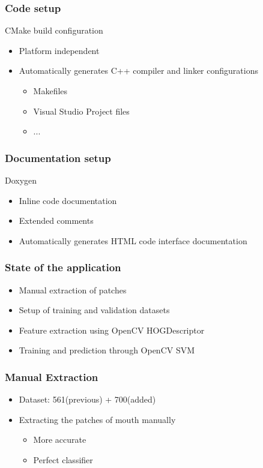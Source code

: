 \documentclass[serif,14pt]{beamer}
\begin{document}
\begin{frame}
  \frametitle{Code setup}
  
  CMake build configuration
  \begin{itemize}
      \item Platform independent
      \item Automatically generates C++ compiler and linker configurations
        \begin{itemize}
          \item Makefiles
          \item Visual Studio Project files
          \item ...
      	\end{itemize}
  \end{itemize}

\end{frame}

\begin{frame}
  \frametitle{Documentation setup}
  
  Doxygen
  \begin{itemize}
      \item Inline code documentation
      \item Extended comments
      \item Automatically generates HTML code interface documentation
  \end{itemize}

\end{frame}

\begin{frame}
  \frametitle{State of the application}
  \begin{itemize}
  	  \item Manual extraction of patches
      \item Setup of training and validation datasets
      \item Feature extraction using OpenCV HOGDescriptor
      \item Training and prediction through OpenCV SVM
  \end{itemize}
\end{frame}

\begin{frame}
  \frametitle{Manual Extraction}

  \begin{itemize}
      \item Dataset: 561(previous) + 700(added)
      \item Extracting the patches of mouth manually
        \begin{itemize}
          \item More accurate
          \item Perfect classifier
      	\end{itemize}
  \end{itemize}
\end{frame}
\end{document}
